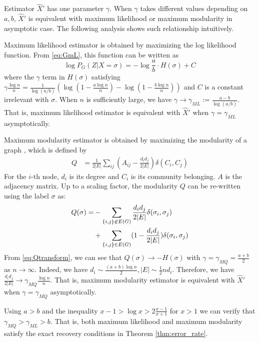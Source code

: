 \documentclass[entropy,article,submit,moreauthors,pdftex]{Definitions/mdpi}
\newcommand{\A}{\frac{a \log n}{n}}
\newcommand{\B}{\frac{b \log n}{n}}
\newcommand{\1}{\mathbbm{1}}
\begin{document}
Estimator $\hat{X}'$ has one parameter $\gamma$. When $\gamma$ takes different values depending on $a,b$, $\hat{X}'$
is equivalent with maximum likelihood or maximum modularity in asymptotic case. The following analysis shows
such relationship intuitively.

Maximum likelihood estimator is obtained by maximizing the log likelihood function.
From \eqref{eq:GmL}, this function can be written as
$$
\log P_G(Z|X=\sigma) = -\log\frac{a}{b} \cdot H(\sigma) + C
$$
where the $\gamma$ term in $H(\sigma)$ satisfying $\gamma \frac{\log n}{n} = \frac{1}{\log(a/b)}(\log (1-\A) - \log (1-\B))$ and $C$ is a constant irrelevant with $\sigma$.
When $n$ is sufficiently large, we have $\gamma \to \gamma_{ML} := \frac{a-b}{\log(a/b)}$.
That is, maximum likelihood estimator is equivalent with $\hat{X}'$ when $\gamma = \gamma_{ML}$ asymptotically.


Maximum modularity estimator is obtained by maximizing the modularity of a graph \cite{clauset2004finding}, which is defined by
\begin{align}\label{eq:Q}
Q &= \frac{1}{2 |E|} \sum_{ij} (A_{ij} - \frac{d_i d_j}{2 |E|}) \delta(C_i, C_j)
\end{align}
For the $i$-th node, $d_i$ is its degree and $C_i$ is its community belonging. $A$ is the adjacency matrix.
Up to a scaling factor, the modularity $Q$ can be re-written using the label $\sigma$ as:
\begin{align}
Q(\sigma) = &-\sum_{\{i,j\} \not\in E(G) } \frac{d_i d_j}{2 |E|}\delta(\sigma_i,\sigma_j) \notag \\
&+ \sum_{\{i,j\} \in E(G) } (1 - \frac{d_i d_j}{2 |E|}) \delta(\sigma_i,\sigma_j)  \label{eq:Qtransform}
\end{align}
From \eqref{eq:Qtransform}, we can see that $Q(\sigma) \to -H(\sigma)$ with $\gamma = \gamma_{MQ} = \frac{a+b}{2}$ as $n\to \infty$.
Indeed, we have $d_i \sim \frac{(a+b)\log n}{2}, |E| \sim \frac{1}{2}n d_i$. Therefore, we have $\frac{d_id_j}{2|E|} \to \gamma_{MQ} \frac{\log n}{n} $. That is, maximum modularity estimator is equivalent with $\hat{X}'$ when $\gamma = \gamma_{MQ}$ asymptotically.


Using $a>b$ and the inequality $x-1>\log x > 2 \frac{x-1}{x+1}$ for $x>1$ we can verify that $\gamma_{MQ} > \gamma_{ML} > b$. That is, both maximum likelihood and maximum modularity satisfy the exact recovery conditions in Theorem \ref{thm:error_rate}.
\end{document}
